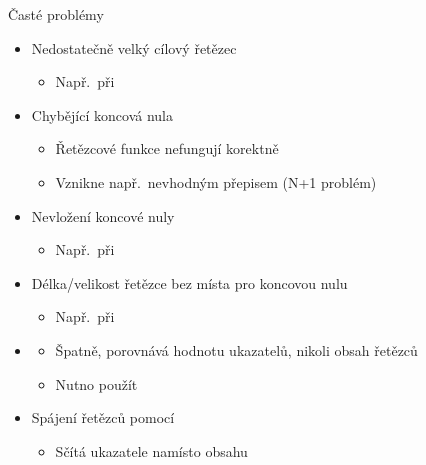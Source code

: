 \begin{frame}{Časté problémy}

  \begin{itemize}
    \item Nedostatečně velký cílový řetězec
    \begin{itemize}
      \item Např.\ při 
    \end{itemize}

    \pause

    \item Chybějící koncová nula
    \begin{itemize}
      \item Řetězcové funkce nefungují korektně
      \item Vznikne např.\ nevhodným přepisem (N+1 problém)
    \end{itemize}

    \pause

    \item Nevložení koncové nuly
    \begin{itemize}
      \item Např.\ při 
    \end{itemize}

    \pause

    \item Délka/velikost řetězce bez místa pro koncovou nulu
    \begin{itemize}
      \item Např.\ při 
    \end{itemize}

    \pause

    \item {}
    \begin{itemize}
      \item Špatně, porovnává hodnotu ukazatelů, nikoli obsah řetězců
      \item Nutno použít 
    \end{itemize}

    \pause

    \item Spájení řetězců pomocí \code{+}
    \begin{itemize}
      \item Sčítá ukazatele namísto obsahu
    \end{itemize}

  \end{itemize}

\end{frame}

